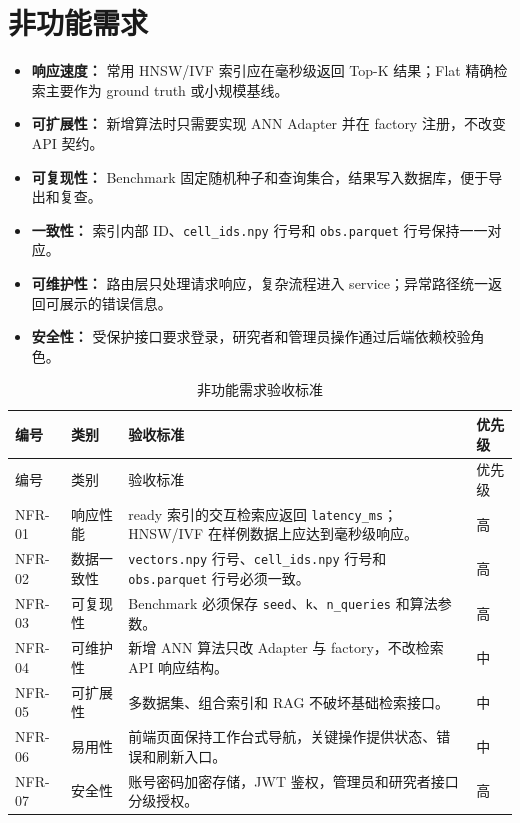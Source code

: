 \documentclass[UTF8,a4paper,12pt]{ctexrep}
\begin{document}
\section{非功能需求}

\begin{itemize}
  \item \textbf{响应速度：} 常用 HNSW/IVF 索引应在毫秒级返回 Top-K 结果；Flat 精确检索主要作为 ground truth 或小规模基线。
  \item \textbf{可扩展性：} 新增算法时只需要实现 ANN Adapter 并在 factory 注册，不改变 API 契约。
  \item \textbf{可复现性：} Benchmark 固定随机种子和查询集合，结果写入数据库，便于导出和复查。
  \item \textbf{一致性：} 索引内部 ID、\texttt{cell\_ids.npy} 行号和 \texttt{obs.parquet} 行号保持一一对应。
  \item \textbf{可维护性：} 路由层只处理请求响应，复杂流程进入 service；异常路径统一返回可展示的错误信息。
  \item \textbf{安全性：} 受保护接口要求登录，研究者和管理员操作通过后端依赖校验角色。
\end{itemize}

\begin{longtable}{@{}L{0.11\textwidth}L{0.19\textwidth}L{0.50\textwidth}L{0.08\textwidth}@{}}
  \caption{非功能需求验收标准} \\
  \toprule
  编号 & 类别 & 验收标准 & 优先级 \\
  \midrule
  \endfirsthead
  \toprule
  编号 & 类别 & 验收标准 & 优先级 \\
  \midrule
  \endhead
  NFR-01 & 响应性能 & ready 索引的交互检索应返回 \texttt{latency\_ms}；HNSW/IVF 在样例数据上应达到毫秒级响应。 & 高 \\
  NFR-02 & 数据一致性 & \texttt{vectors.npy} 行号、\texttt{cell\_ids.npy} 行号和 \texttt{obs.parquet} 行号必须一致。 & 高 \\
  NFR-03 & 可复现性 & Benchmark 必须保存 \texttt{seed}、\texttt{k}、\texttt{n\_queries} 和算法参数。 & 高 \\
  NFR-04 & 可维护性 & 新增 ANN 算法只改 Adapter 与 factory，不改检索 API 响应结构。 & 中 \\
  NFR-05 & 可扩展性 & 多数据集、组合索引和 RAG 不破坏基础检索接口。 & 中 \\
  NFR-06 & 易用性 & 前端页面保持工作台式导航，关键操作提供状态、错误和刷新入口。 & 中 \\
  NFR-07 & 安全性 & 账号密码加密存储，JWT 鉴权，管理员和研究者接口分级授权。 & 高 \\
  \bottomrule
\end{longtable}
\end{document}
